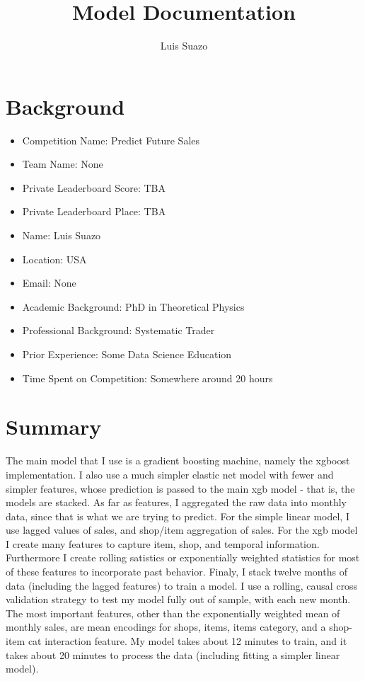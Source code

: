 \documentclass[a4paper]{article}
\title{Model Documentation}
\author{Luis Suazo}
\date{}
\begin{document}
\maketitle

\section{Background}	
\begin{itemize}
  \item Competition Name: Predict Future Sales
  \item Team Name: None
  \item Private Leaderboard Score: TBA
  \item Private Leaderboard Place: TBA
  \item Name: Luis Suazo
  \item Location: USA
  \item Email: None
  \item Academic Background: PhD in Theoretical Physics
  \item Professional Background: Systematic Trader
  \item Prior Experience: Some Data Science Education
  \item Time Spent on Competition: Somewhere around 20 hours
\end{itemize}	

\section{Summary}
The main model that I use is a gradient boosting machine, namely the xgboost implementation. I also use a much simpler elastic net model with fewer and simpler features, whose prediction is passed to the main xgb model - that is, the models are stacked. As far as features, I aggregated the raw data into monthly data, since that is what we are trying to predict. For the simple linear model, I use lagged values of sales, and shop/item aggregation of sales. For the xgb model I create many features to capture item, shop, and temporal information. Furthermore I create rolling satistics or exponentially weighted statistics for most of these features to incorporate past behavior. Finaly, I stack twelve months of data (including the lagged features) to train a model. I use a rolling, causal cross validation strategy to test my model fully out of sample, with each new month. The most important features, other than the exponentially weighted mean of monthly sales, are mean encodings for shops, items, items category, and a shop-item cat interaction feature. My model takes about 12 minutes to train, and it takes about 20 minutes to process the data (including fitting a simpler linear model).
\end{document}
